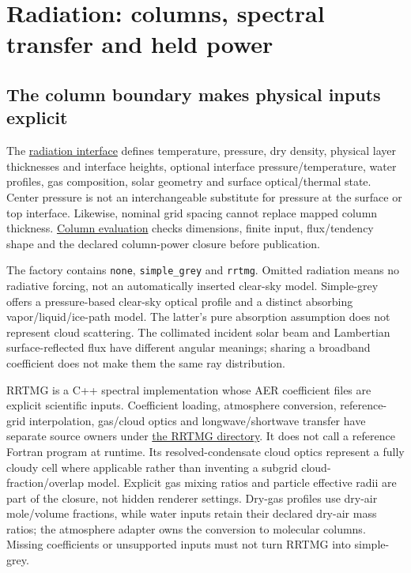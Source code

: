 \section{Radiation: columns, spectral transfer and held power}
\label{architecture-radiation}

\subsection{The column boundary makes physical inputs explicit}

The \href{../include/radiation/radiation_base.hpp}{radiation interface} defines
temperature, pressure, dry density, physical layer thicknesses and interface
heights, optional interface pressure/temperature, water profiles, gas
composition, solar geometry and surface optical/thermal state. Center pressure
is not an interchangeable substitute for pressure at the surface or top
interface. Likewise, nominal grid spacing cannot replace mapped column
thickness. \href{../src/radiation/column_evaluation.cpp}{Column evaluation}
checks dimensions, finite input, flux/tendency shape and the declared
column-power closure before publication.

The factory contains \texttt{none}, \texttt{simple\_grey} and \texttt{rrtmg}.
Omitted radiation means no radiative forcing, not an automatically inserted
clear-sky model. Simple-grey offers a pressure-based clear-sky optical profile
and a distinct absorbing vapor/liquid/ice-path model. The latter's pure
absorption assumption does not represent cloud scattering. The collimated
incident solar beam and Lambertian surface-reflected flux have different
angular meanings; sharing a broadband coefficient does not make them the
same ray distribution.

RRTMG is a C++ spectral implementation whose AER coefficient files are explicit
scientific inputs. Coefficient loading, atmosphere conversion, reference-grid
interpolation, gas/cloud optics and longwave/shortwave transfer have separate
source owners under \href{../src/radiation/schemes/rrtmg}{the RRTMG directory}.
It does not call a reference Fortran program at runtime. Its resolved-condensate
cloud optics represent a fully cloudy cell where applicable rather than
inventing a subgrid cloud-fraction/overlap model. Explicit gas mixing ratios
and particle effective radii are part of the closure, not hidden renderer
settings. Dry-gas profiles use dry-air mole/volume fractions, while water inputs
retain their declared dry-air mass ratios; the atmosphere adapter owns the
conversion to molecular columns. Missing coefficients or unsupported inputs
must not turn RRTMG into simple-grey.

